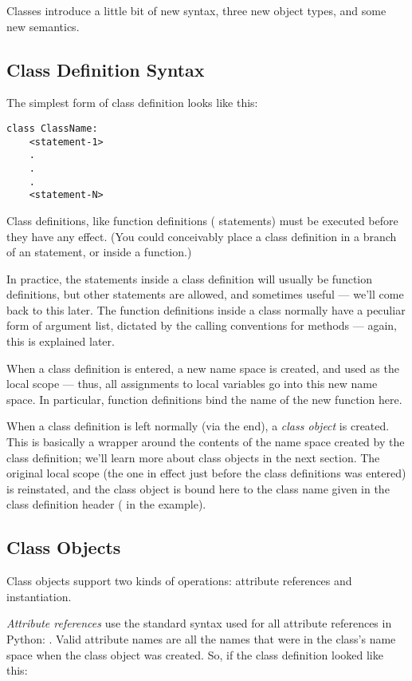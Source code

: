 \documentclass{manual}
\begin{document}
Classes introduce a little bit of new syntax, three new object types,
and some new semantics.


\subsection{Class Definition Syntax \label{classDefinition}}

The simplest form of class definition looks like this:

\begin{verbatim}
class ClassName:
    <statement-1>
    .
    .
    .
    <statement-N>
\end{verbatim}

Class definitions, like function definitions (
statements) must be executed before they have any effect.  (You could
conceivably place a class definition in a branch of an 
statement, or inside a function.)

In practice, the statements inside a class definition will usually be
function definitions, but other statements are allowed, and sometimes
useful --- we'll come back to this later.  The function definitions
inside a class normally have a peculiar form of argument list,
dictated by the calling conventions for methods --- again, this is
explained later.

When a class definition is entered, a new name space is created, and
used as the local scope --- thus, all assignments to local variables
go into this new name space.  In particular, function definitions bind
the name of the new function here.

When a class definition is left normally (via the end), a \emph{class
object} is created.  This is basically a wrapper around the contents
of the name space created by the class definition; we'll learn more
about class objects in the next section.  The original local scope
(the one in effect just before the class definitions was entered) is
reinstated, and the class object is bound here to the class name given
in the class definition header ( in the example).


\subsection{Class Objects \label{classObjects}}

Class objects support two kinds of operations: attribute references
and instantiation.

\emph{Attribute references} use the standard syntax used for all
attribute references in Python: .  Valid attribute
names are all the names that were in the class's name space when the
class object was created.  So, if the class definition looked like
this:
\end{document}
